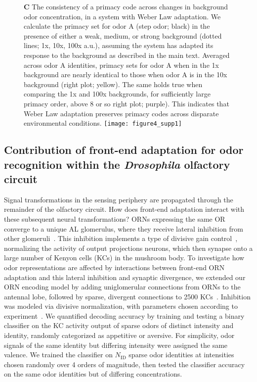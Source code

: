 \documentclass[9pt,lineno]{elife}
\begin{document}
\begin{figure}[tb]
{			\textbf{C} The consistency of a primacy code across changes in background odor concentration, in a system with Weber Law adaptation. We calculate the primacy set for odor A (step odor; black) in the presence of either a weak, medium, or strong background (dotted lines; 1x, 10x, 100x a.u.), assuming the system has adapted its response to the background as described in the main text. Averaged across odor A identities, primacy sets for odor A when in the 1x background are nearly identical to those when odor A is in the 10x background (right plot; yellow). The same holds true when comparing the 1x and 100x backgrounds, for sufficiently large primacy order, above 8 or so right plot; purple). This indicates that Weber Law adaptation preserves primacy codes across disparate environmental conditions.}
			{\texttt{[image: figure4\_supp1]}}\label{figsupp:SI_primacy}
\end{figure}




\subsection{Contribution of front-end adaptation for odor recognition within the \textit{Drosophila} olfactory circuit}



Signal transformations in the sensing periphery are propagated through the remainder of the olfactory circuit. How does front-end adaptation interact with these subsequent neural transformations? ORNs expressing the same OR converge to a unique AL glomerulus, where they receive lateral inhibition from other glomeruli~\citep{lateral_inh, lateral_inh_asahina}. This inhibition implements a type of divisive gain control~\citep{divisive_normalization}, normalizing the activity of output projections neurons, which then synapse onto a large number of Kenyon cells (KCs) in the mushroom body. To investigate how odor representations are affected by interactions between front-end ORN adaptation and this lateral inhibition and synaptic divergence, we extended our ORN encoding model by adding uniglomerular connections from ORNs to the antennal lobe, followed by sparse, divergent connections to 2500 KCs~\citep{memory_review, litwinkumar, abbott_axel}. Inhibition was modeled via divisive normalization, with parameters chosen according to experiment~\citep{divisive_normalization}.
We quantified decoding accuracy by training and testing a binary classifier on the KC activity output of sparse odors of distinct intensity and identity, randomly categorized as appetitive or aversive. For simplicity, odor signals of the same identity but differing intensity were assigned the same valence. We trained the classifier on $N_{{\text {ID}}}$ sparse odor identities at intensities chosen randomly over 4 orders of magnitude, then tested the classifier accuracy on the same odor identities but of differing concentrations. 
\end{document}
